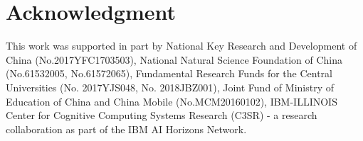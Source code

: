 \documentclass[letterpaper]{article} \usepackage{formatting-instructions-latex-2019}  \usepackage{times}  \usepackage{helvet}  \usepackage{courier}  \usepackage{url}  \usepackage{graphicx}  \frenchspacing  \setlength{\pdfpagewidth}{8.5in}  \setlength{\pdfpageheight}{11in}
\begin{document}
\section{Acknowledgment}



This work was supported in part by National Key Research and Development of China (No.2017YFC1703503), National Natural Science Foundation of China (No.61532005, No.61572065),  Fundamental Research Funds for the Central Universities (No. 2017YJS048, No. 2018JBZ001), Joint Fund of Ministry of Education of China and China Mobile (No.MCM20160102), IBM-ILLINOIS Center for Cognitive Computing Systems Research (C3SR) - a research collaboration as part of the IBM AI Horizons Network.
 
 
 
\end{document}
